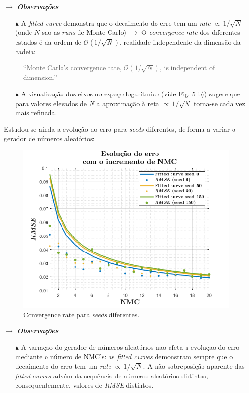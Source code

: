 \noindent\textbf{\textit{$\rightarrow$ Observações}}

\begin{itemize}
    \item[$\blacktriangle$] A \textit{fitted curve} demonstra que o decaimento do erro tem um \textit{rate} $\propto\, 1/\sqrt{N}$ (onde $N$ são as \textit{runs} de Monte Carlo) $\rightarrow$ O \textit{convergence rate} dos diferentes estados é da ordem de $\mathcal{O}(1/\sqrt{N})$, realidade independente da dimensão da cadeia:
\end{itemize}
\begin{quote}
    ``Monte Carlo's convergence rate, $\mathcal{O}(1/\sqrt{N})$, is independent of dimension.''\cite{caflisch_2008}
\end{quote}

\begin{itemize}
    \item[$\blacktriangle$] A visualização dos eixos no espaço logarítmico (vide \hyperref[fig:P2ii-log]{Fig. 5 b)}) sugere que para valores elevados de $N$ a aproximação à reta $\propto\: 1/\sqrt{N}$ torna-se cada vez mais refinada.
\end{itemize}

Estudou-se ainda a evolução do erro para \textit{seeds} diferentes, de forma a variar o gerador de números aleatórios:

\begin{figure}[H]
    \centering
    \includegraphics[width = 0.6\linewidth]{img/P2/P2iiseed.png}
    \caption{Convergence rate para \textit{seeds} diferentes.}
    \label{fig:seed}
\end{figure}

\noindent\textbf{\textit{$\rightarrow$ Observações}}

\begin{itemize}
    \item[$\blacktriangle$] A variação do gerador de números aleatórios não afeta a evolução do erro mediante o número de NMC's: as \textit{fitted curves} demonstram sempre que o decaimento do erro tem um \textit{rate} $\propto\: 1/\sqrt{N}$. A não sobreposição aparente das \textit{fitted curves} advém da sequência de números aleatórios distintos, consequentemente, valores de \textit{RMSE} distintos.
\end{itemize}

